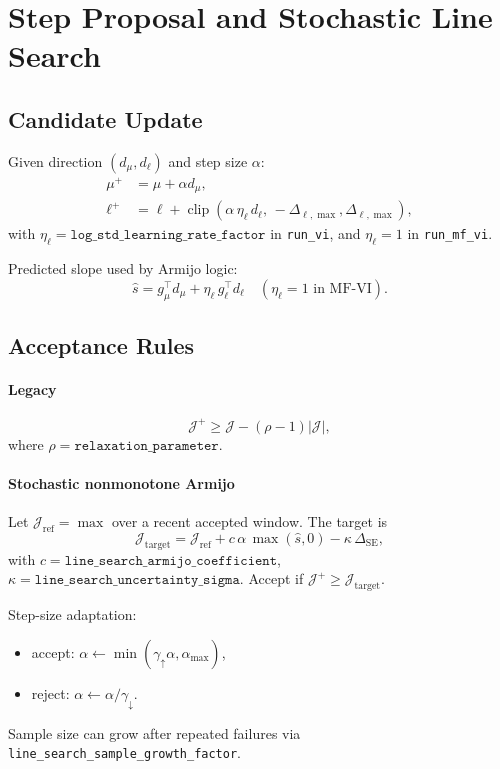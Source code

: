 \documentclass[11pt]{article}
\begin{document}
\section{Step Proposal and Stochastic Line Search}
\subsection{Candidate Update}
Given direction \((d_\mu,d_\ell)\) and step size \(\alpha\):
\begin{align}
\mu^+ &= \mu + \alpha d_\mu,\\
\ell^+ &= \ell + \operatorname{clip}\!\left(\alpha\,\eta_\ell\, d_\ell,\,-\Delta_{\ell,\max},\Delta_{\ell,\max}\right),
\end{align}
with \(\eta_\ell=\texttt{log\_std\_learning\_rate\_factor}\) in \texttt{run\_vi}, and \(\eta_\ell=1\) in \texttt{run\_mf\_vi}.

Predicted slope used by Armijo logic:
\begin{equation}
\hat s = g_\mu^\top d_\mu + \eta_\ell\, g_\ell^\top d_\ell
\quad(\eta_\ell=1\text{ in MF-VI}).
\end{equation}

\subsection{Acceptance Rules}
\paragraph{Legacy}
\begin{equation}
\mathcal{J}^+ \ge \mathcal{J} - (\rho-1)|\mathcal{J}|,
\end{equation}
where \(\rho=\texttt{relaxation\_parameter}\).

\paragraph{Stochastic nonmonotone Armijo}
Let \(\mathcal{J}_{\mathrm{ref}}=\max\) over a recent accepted window.
The target is
\begin{equation}
\mathcal{J}_{\mathrm{target}}
= \mathcal{J}_{\mathrm{ref}}
+ c\,\alpha\,\max(\hat s,0)
- \kappa\,\Delta_{\mathrm{SE}},
\end{equation}
with \(c=\texttt{line\_search\_armijo\_coefficient}\),
\(\kappa=\texttt{line\_search\_uncertainty\_sigma}\).
Accept if \(\mathcal{J}^+\ge \mathcal{J}_{\mathrm{target}}\).

Step-size adaptation:
\begin{itemize}
  \item accept: \(\alpha\leftarrow \min(\gamma_{\uparrow}\alpha,\alpha_{\max})\),
  \item reject: \(\alpha\leftarrow \alpha/\gamma_{\downarrow}\).
\end{itemize}
Sample size can grow after repeated failures via \texttt{line\_search\_sample\_growth\_factor}.
\end{document}
